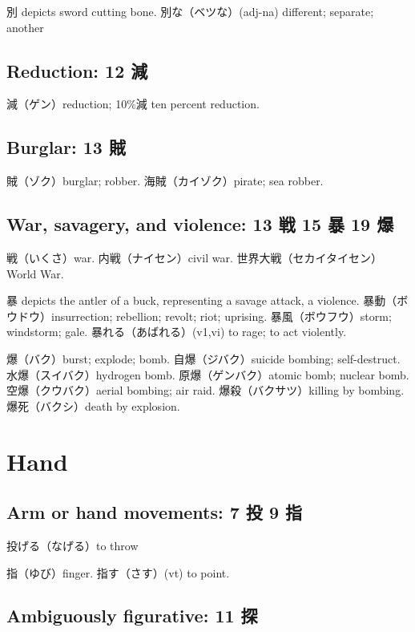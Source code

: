 別 depicts sword cutting bone.
別な（ベツな）(adj-na) different; separate; another

\subsection{Reduction: 12 減}

減（ゲン）reduction; 10\%減 ten percent reduction.

\subsection{Burglar: 13 賊}

賊（ゾク）burglar; robber.
海賊（カイゾク）pirate; sea robber.

\subsection{War, savagery, and violence: 13 戦 15 暴 19 爆}

戦（いくさ）war.
内戦（ナイセン）civil war.
世界大戦（セカイタイセン）World War.

暴 depicts the antler of a buck, representing a savage attack, a violence.
暴動（ボウドウ）insurrection; rebellion; revolt; riot; uprising.
暴風（ボウフウ）storm; windstorm; gale.
暴れる（あばれる）(v1,vi) to rage; to act violently.

爆（バク）burst; explode; bomb.
自爆（ジバク）suicide bombing; self-destruct.
水爆（スイバク）hydrogen bomb.
原爆（ゲンバク）atomic bomb; nuclear bomb.
空爆（クウバク）aerial bombing; air raid.
爆殺（バクサツ）killing by bombing.
爆死（バクシ）death by explosion.

\section{Hand}

\subsection{Arm or hand movements: 7 投 9 指}

投げる（なげる）to throw

指（ゆび）finger.
指す（さす）(vt) to point.

\subsection{Ambiguously figurative: 11 探}

